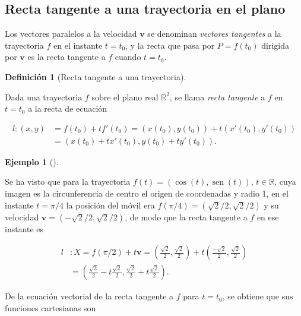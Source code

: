 \documentclass[
  a4paper,
]{scrreport}
\theoremstyle{definition}
\newtheorem{example}{Ejemplo}[chapter]
\theoremstyle{plain}
\theoremstyle{definition}
\newtheorem{definition}{Definición}[chapter]
\theoremstyle{definition}
\theoremstyle{plain}
\theoremstyle{plain}
\theoremstyle{remark}
\begin{document}
\subsection{Recta tangente a una trayectoria en el
plano}\label{recta-tangente-a-una-trayectoria-en-el-plano}

Los vectores paralelos a la velocidad \(\mathbf{v}\) se denominan
\emph{vectores tangentes} a la trayectoria \(f\) en el instante
\(t=t_0\), y la recta que pasa por \(P=f(t_0)\) dirigida por
\(\mathbf{v}\) es la recta tangente a \(f\) cuando \(t=t_0\).

\begin{definition}[Recta tangente a una
trayectoria]\protect\hypertarget{def-tangente-trayectoria}{}\label{def-tangente-trayectoria}

Dada una trayectoria \(f\) sobre el plano real \(\mathbb{R}^2\), se
llama \emph{recta tangente} a \(f\) en \(t=t_0\) a la recta de ecuación

\begin{align*}
l: (x,y)&= f(t_0)+tf'(t_0) = (x(t_0),y(t_0))+t(x'(t_0),y'(t_0))\\
&= (x(t_0)+tx'(t_0),y(t_0)+ty'(t_0)).
\end{align*}

\end{definition}

\begin{example}[]\protect\hypertarget{exm-tangente-trayectoria}{}\label{exm-tangente-trayectoria}

Se ha visto que para la trayectoria
\(f(t) = (\cos(t),\operatorname{sen}(t))\), \(t\in \mathbb{R}\), cuya
imagen es la circunferencia de centro el origen de coordenadas y radio
1, en el instante \(t=\pi/4\) la posición del móvil era
\(f(\pi/4)=(\sqrt{2}/2,\sqrt{2}/2)\) y su velocidad
\(\mathbf{v}=(-\sqrt{2}/2,\sqrt{2}/2)\), de modo que la recta tangente a
\(f\) en ese instante es

\begin{align*}
l &: X=f(\pi/2)+t\mathbf{v} = \left(\frac{\sqrt{2}}{2},\frac{\sqrt{2}}{2}\right)+t\left(\frac{-\sqrt{2}}{2},\frac{\sqrt{2}}{2}\right) \\ 
&=
\left(\frac{\sqrt{2}}{2}-t\frac{\sqrt{2}}{2},\frac{\sqrt{2}}{2}+t\frac{\sqrt{2}}{2}\right).
\end{align*}

\end{example}

De la ecuación vectorial de la recta tangente a \(f\) para \(t=t_0\), se
obtiene que sus funciones cartesianas son
\end{document}
